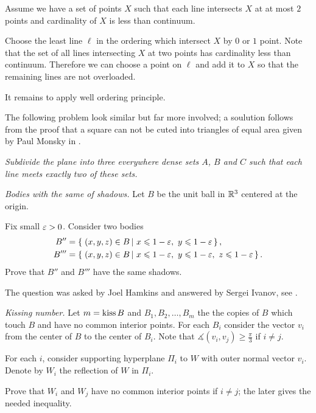 Assume we have a set of points $X$ such that each line intersects $X$ at at most $2$ points and cardinality of $X$ is less than continuum.

Choose the least line $\ell$ in the ordering which intersect $X$ 
by $0$ or $1$ point.
Note that the set of all lines intersecting $X$ at two points has cardinality less than continuum.
Therefore we can choose a point on $\ell$ and add it to $X$ so that the remaining lines are not overloaded.

It remains to apply well ordering principle.

The following problem look similar but far more involved;
a soulution follows from the proof that a square can not be cuted into triangles of equal area given by Paul Monsky in \cite{monsky}.

{\it Subdivide the plane into three everywhere dense sets $A$, $B$ and $C$ such that each line meets exactly two of these sets.
}



\textit{Bodies with the same of shadows.}
Let $B$ be the unit ball in $\mathbb{R}^3$ centered at the origin.

Fix small $\varepsilon>0$.
Consider two bodies 
\begin{align*}
B''&=\set{(x,y,z)\in B}{x\le 1-\eps,\  y\le 1-\eps},
\\ 
B'''&=\set{(x,y,z)\in B}{x\le 1-\eps,\  y\le 1-\eps,\  z\le 1-\eps}.
\end{align*}
Prove that $B''$ and $B'''$ have the same shadows.

 The question was asked by Joel Hamkins and answered by Sergei Ivanov, see \cite{hamkins}.



\textit{Kissing number.}
Let $m=\mathop{\rm kiss} B$
and $B_1,B_2,\dots, B_m$ the the copies of $B$ 
which touch $B$ and have no common interior points.
For each $B_i$ consider the vector $v_i$ from the center of $B$ to the center of $B_i$.
Note that $\measuredangle(v_i,v_j)\ge \tfrac\pi3$ if $i\ne j$.

For each $i$,
consider supporting hyperplane $\Pi_i$
to $W$
with outer normal vector $v_i$.
Denote by $W_i$ the reflection of $W$ in $\Pi_i$.

Prove that $W_i$ and $W_j$ have no common interior points if $i\ne j$;
the later gives the needed inequality.

